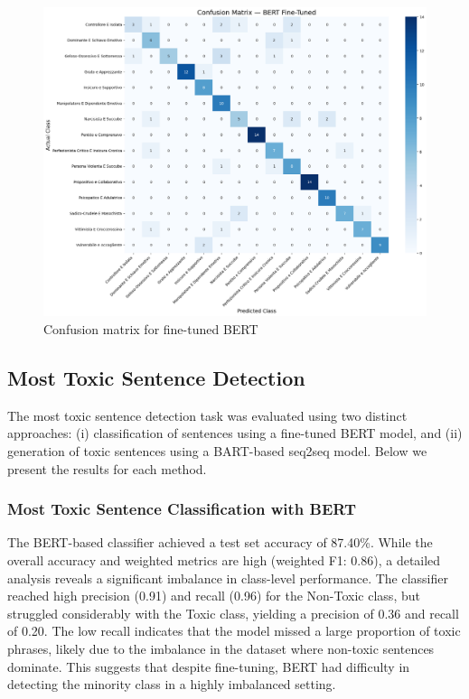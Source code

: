 \documentclass[conference]{IEEEtran}
\begin{document}
\begin{figure}[H]
  \centering
  \includegraphics[width=\columnwidth]{figures/bert_finetuned_confusion_matrix.png}
  \caption{Confusion matrix for fine-tuned BERT}
  \label{fig:bert_cm}
\end{figure}

\subsection{Most Toxic Sentence Detection}
\noindent

The most toxic sentence detection task was evaluated using two distinct approaches: (i) classification of sentences using a fine-tuned BERT model, and (ii) generation of toxic sentences using a BART-based seq2seq model. Below we present the results for each method.

\subsubsection{Most Toxic Sentence Classification with BERT}
\noindent

The BERT-based classifier achieved a test set accuracy of 87.40\%. While the overall accuracy and weighted metrics are high (weighted F1: 0.86), a detailed analysis reveals a significant imbalance in class-level performance. The classifier reached high precision (0.91) and recall (0.96) for the Non-Toxic class, but struggled considerably with the Toxic class, yielding a precision of 0.36 and recall of 0.20. The low recall indicates that the model missed a large proportion of toxic phrases, likely due to the imbalance in the dataset where non-toxic sentences dominate. This suggests that despite fine-tuning, BERT had difficulty in detecting the minority class in a highly imbalanced setting.
\end{document}
